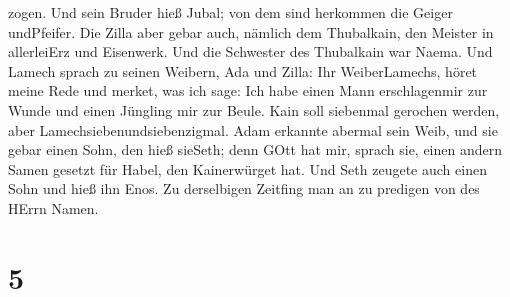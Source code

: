 zogen.  Und sein Bruder hieß Jubal; von dem sind herkommen
die Geiger undPfeifer.  Die Zilla aber gebar auch, nämlich
dem Thubalkain, den Meister in allerleiErz und Eisenwerk. Und die
Schwester des Thubalkain war Naema.  Und Lamech sprach zu
seinen Weibern, Ada und Zilla: Ihr WeiberLamechs, höret meine Rede und
merket, was ich sage: Ich habe einen Mann erschlagenmir zur Wunde und
einen Jüngling mir zur Beule.  Kain soll siebenmal gerochen
werden, aber Lamechsiebenundsiebenzigmal.  Adam erkannte
abermal sein Weib, und sie gebar einen Sohn, den hieß sieSeth; denn GOtt
hat mir, sprach sie, einen andern Samen gesetzt für Habel, den
Kainerwürget hat.  Und Seth zeugete auch einen Sohn und
hieß ihn Enos. Zu derselbigen Zeitfing man an zu predigen von des HErrn
Namen.

\hypertarget{section-4}{%
\section{5}\label{section-4}}

